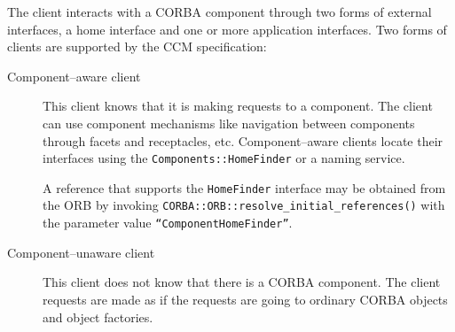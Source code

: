 The client interacts with a CORBA component through two forms of external
interfaces, a home interface and one or more application interfaces. Two forms
of clients are supported by the CCM specification:

\begin{description}
\item [Component--aware client]
This client knows that it is making requests to a component. The client can use
component mechanisms like navigation between components through facets and
receptacles, etc. Component--aware clients locate their interfaces using the
{\tt Components::HomeFinder} or a naming service.

A reference that supports the {\tt HomeFinder} interface may be obtained from
the ORB by invoking {\tt CORBA::ORB::resolve\_initial\_references()} with the
parameter value {\tt ``ComponentHomeFinder''}.

\item [Component--unaware client]
This client does not know that there is a CORBA component. The client requests
are made as if the requests are going to ordinary CORBA objects and object
factories.
\end{description}
